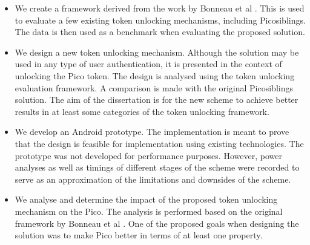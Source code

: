 \begin{itemize}
	\item We create a framework derived from the work by Bonneau et al \cite{bonneau2012quest}. This is used to evaluate a few existing token unlocking mechanisms, including Picosiblings. The data is then used as a benchmark when evaluating the proposed solution.
	
	\item We design a new token unlocking mechanism. Although the solution may be used in any type of user authentication, it is presented in the context of unlocking the Pico token. The design is analysed using the token unlocking evaluation framework. A comparison is made with the original Picosiblings solution. The aim of the dissertation is for the new scheme to achieve better results in at least some categories of the token unlocking framework.
	
	\item We develop an Android prototype. The implementation is meant to prove that the design is feasible for implementation using existing technologies. The prototype was not developed for performance purposes. However, power analyses as well as timings of different stages of the scheme were recorded to serve as an approximation of the limitations and downsides of the scheme.
	
	\item We analyse and determine the impact of the proposed token unlocking mechanism on the Pico. The analysis is performed based on the original framework by Bonneau et al \cite{bonneau2012quest}. One of the proposed goals when designing the solution was to make Pico better in terms of at least one property.
	
\end{itemize}	
